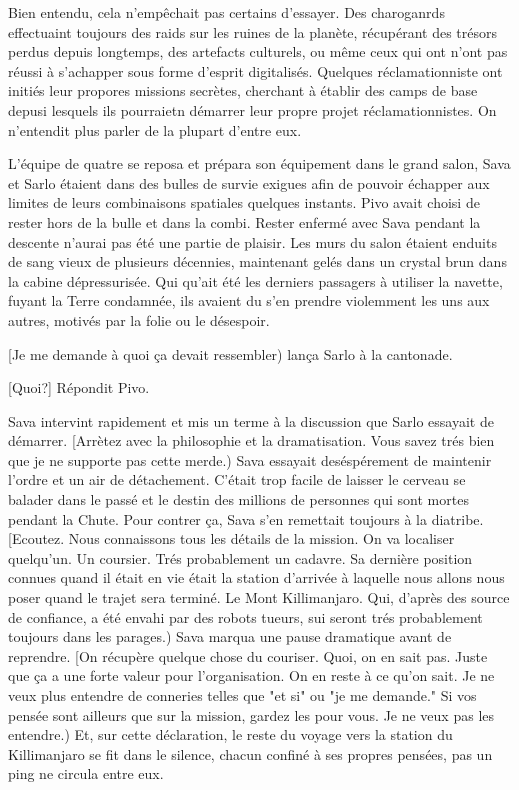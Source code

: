 Bien entendu, cela n'empêchait pas certains d'essayer. Des charoganrds effectuaint toujours des raids sur les ruines de la planète, récupérant des trésors perdus depuis longtemps, des artefacts culturels, ou même ceux qui ont n'ont pas réussi à s'achapper sous forme d'esprit digitalisés. Quelques réclamationniste ont initiés leur propores missions secrètes, cherchant à établir des camps de base depusi lesquels ils pourraietn démarrer leur propre projet réclamationnistes. On n'entendit plus parler de la plupart d'entre eux. 

L'équipe de quatre se reposa et prépara son équipement dans le grand salon, Sava et Sarlo étaient dans des bulles de survie exigues afin de pouvoir échapper aux limites de leurs combinaisons spatiales quelques instants. Pivo avait choisi de rester hors de la bulle et dans la combi. Rester enfermé avec Sava pendant la descente n'aurai pas été une partie de plaisir. Les murs du salon étaient enduits de sang vieux de plusieurs décennies, maintenant gelés dans un crystal brun dans la cabine dépressurisée. Qui qu'ait été les derniers passagers à utiliser la navette, fuyant la Terre condamnée, ils avaient du s'en prendre violemment les uns aux autres, motivés par la folie ou le désespoir. 

[Je me demande à quoi ça devait ressembler) lança Sarlo à la cantonade. 

[Quoi?] Répondit Pivo. 

Sava intervint rapidement et mis un terme à la discussion que Sarlo essayait de démarrer. [Arrètez avec la philosophie et la dramatisation. Vous savez trés bien que je ne supporte pas cette merde.) Sava essayait deséspérement de maintenir l'ordre et un air de détachement. C'était trop facile de laisser le cerveau se balader dans le passé et le destin des millions de personnes qui sont mortes pendant la Chute. Pour contrer ça, Sava s'en remettait toujours à la diatribe. [Ecoutez. Nous connaissons tous les détails de la mission. On va localiser quelqu'un. Un coursier. Trés probablement un cadavre. Sa dernière position connues quand il était en vie était la station d'arrivée à laquelle nous allons nous poser quand le trajet sera terminé. Le Mont Killimanjaro. Qui, d'après des source de confiance, a été envahi par des robots tueurs, sui seront trés probablement toujours dans les parages.) Sava marqua une pause dramatique avant de reprendre. [On récupère quelque chose du couriser. Quoi, on en sait pas. Juste que ça a une forte valeur pour l'organisation. On en reste à ce qu'on sait. Je ne veux plus entendre de conneries telles que "et si" ou "je me demande." Si vos pensée sont ailleurs que sur la mission, gardez les pour vous. Je ne veux pas les entendre.) Et, sur cette déclaration, le reste du voyage vers la station du  Killimanjaro  se fit dans le silence, chacun confiné à ses propres pensées, pas un ping ne circula entre eux. 

